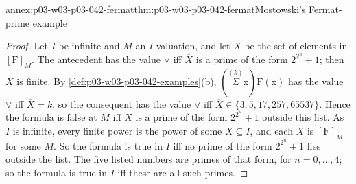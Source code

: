 \begin{annexitem}{annex:p03-w03-p03-042-fermat}{thm:p03-w03-p03-042-fermat}{Mostowski's Fermat-prime example}
\begin{proof}
Let \(I\) be infinite and \(M\) an \(I\)-valuation, and let \(X\) be the
set of elements in \([\mathrm F]_M\).  The antecedent has the value
\(\vee\) iff \(\overline X\) is a prime of the form \(2^{2^n}+1\); then
\(X\) is finite.  By \cref{def:p03-w03-p03-042-examples}(b),
\((\overset{(k)}{\Sigma}\mathrm x)\mathrm F(\mathrm x)\) has the value
\(\vee\) iff \(\overline X=k\), so the consequent has the value \(\vee\)
iff \(\overline X\in\{3,5,17,257,65537\}\).  Hence the formula is false
at \(M\) iff \(\overline X\) is a prime of the form \(2^{2^n}+1\) outside
this list.  As \(I\) is infinite, every finite power is the power of some
\(X\subseteq I\), and each \(X\) is \([\mathrm F]_M\) for some \(M\).  So
the formula is true in \(I\) iff no prime of the form \(2^{2^n}+1\) lies
outside the list.  The five listed numbers are primes of that form, for
\(n=0,\ldots,4\); so the formula is true in \(I\) iff these are all such
primes.
\end{proof}
\end{annexitem}

